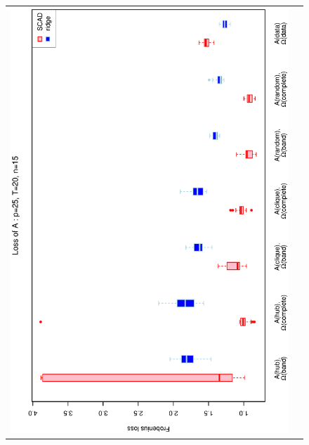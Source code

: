 \begin{figure}[h!]
\centering
\begin{tabular}{cc}
\includegraphics[scale=0.45,angle=270]{LossA25T20N15_25.eps}
\\

\end{tabular}
\end{figure}
